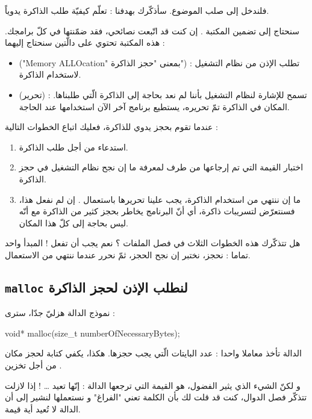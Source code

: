 فلندخل إلى صلب الموضوع. سأذكّرك بهدفنا : تعلّم كيفيّة طلب الذاكرة يدوياً.

سنحتاج إلى تضمين المكتبة
.
إن كنت قد اتّبعت نصائحي، فقد ضمّنتها في كلّ برامجك. هذه المكتبة تحتوي على دالّتين سنحتاج إليهما :

\begin{itemize}
  \item {} ("\textenglish{Memory ALLOcation}"
بمعنى "حجز الذاكرة") : تطلب الإذن من نظام التشغيل لاستخدام الذاكرة.
  \item {}
(تحرير) : تسمح للإشارة لنظام التشغيل بأننا لم نعد بحاجة إلى الذاكرة الّتي طلبناها. المكان في الذاكرة تمّ تحريره، يستطيع برنامج آخر الآن استخدامها عند الحاجة.
\end{itemize}

عندما تقوم بحجز يدوي للذاكرة، فعليك اتباع الخطوات التالية :

\begin{enumerate}
  \item استدعاء
من أجل طلب الذاكرة.
  \item اختبار القيمة التي تم إرجاعها من طرف
لمعرفة ما إن نجح نظام التشغيل في حجز الذاكرة.
  \item ما إن ننتهي من استخدام الذاكرة، يجب علينا تحريرها باستعمال
.
إن لم نفعل هذا، فسنتعرّض لتسريبات ذاكرة، أي أنّ البرنامج يخاطر بحجز كثير من الذاكرة مع أنّه ليس بحاجة إلى كلّ هذا المكان.
\end{enumerate}

هل تتذكّرك هذه الخطوات الثلاث في فصل الملفات ؟ نعم يجب أن تفعل ! المبدأ واحد تماما : نحجز، نختبر إن نجح الحجز، ثمّ نحرر عندما ننتهي من الاستعمال.

\subsection{\texttt{malloc} لنطلب الإذن لحجز الذاكرة}
نموذج الدالة
هزليّ جدّا، سترى :

\begin{Csource}
void* malloc(size_t numberOfNecessaryBytes);
\end{Csource}

الدالة تأخذ معاملا واحدا : عدد البايتات الّتي يجب حجزها. هكذا، يكفي كتابة
لحجز مكان من أجل تخزين
.

و لكنّ الشيء الذي يثير الفضول، هو القيمة التي ترجعها الدالة : إنّها تعيد \dots
{} !
إذا لازلت تتذكّر فصل الدوال، كنت قد قلت لك بأن الكلمة
تعني "الفراغ" و نستعملها لنشير إلى أن الدالة لا تُعيد أية قيمة.

